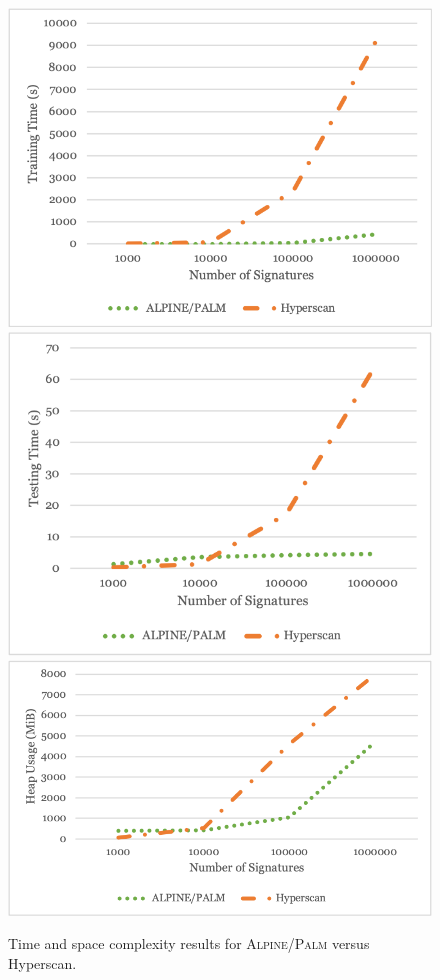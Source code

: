 \begin{figure} [ht!]
  \centering
  \includegraphics[width=0.6\columnwidth]{chapters/4/img/trainingtime.png}
  \includegraphics[width=0.6\columnwidth]{chapters/4/img/testingtime.png}
  \includegraphics[width=0.6\columnwidth]{chapters/4/img/memoryusage.png}
  \caption{Time and space complexity results for \textsc{Alpine}/\textsc{Palm} versus Hyperscan.}
  \label{fig:hyperscancompare}
\end{figure}
